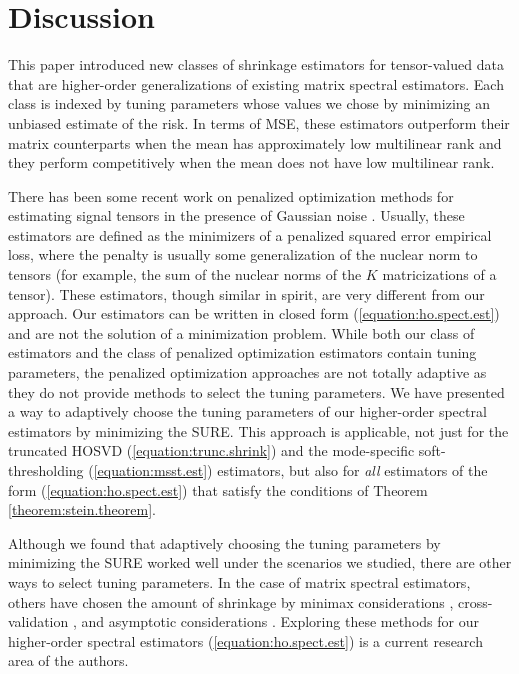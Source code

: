 \section{Discussion}
\label{sec:discussion}

This paper introduced new classes of shrinkage estimators for
tensor-valued data that are higher-order generalizations of existing
matrix spectral estimators. Each class is indexed by tuning parameters
whose values we chose by minimizing an unbiased estimate of the
risk. In terms of MSE, these estimators outperform their matrix
counterparts when the mean has approximately low multilinear rank and
they perform competitively when the mean does not have low multilinear
rank.

There has been some recent work on penalized optimization methods for
estimating signal tensors in the presence of Gaussian noise
\citep{signoretto2010convex,tomioka2011estimation,tomioka2011statistical,liu2013tensor,tomioka2013convex}. Usually,
these estimators are defined as the minimizers of a penalized squared
error empirical loss, where the penalty is usually some generalization
of the nuclear norm to tensors (for example, the sum of the nuclear
norms of the $K$ matricizations of a tensor). These estimators, though
similar in spirit, are very different from our approach. Our
estimators can be written in closed form (\ref{equation:ho.spect.est})
and are not the solution of a minimization problem. While both our
class of estimators and the class of penalized optimization estimators
contain tuning parameters, the penalized optimization approaches are
not totally adaptive as they do not provide methods to select the
tuning parameters. We have presented a way to adaptively choose the
tuning parameters of our higher-order spectral estimators by
minimizing the SURE. This approach is applicable, not just for the
truncated HOSVD (\ref{equation:trunc.shrink}) and the mode-specific
soft-thresholding (\ref{equation:msst.est}) estimators, but also for
\emph{all} estimators of the form (\ref{equation:ho.spect.est}) that
satisfy the conditions of Theorem \ref{theorem:stein.theorem}.

Although we found that adaptively choosing the tuning parameters by
minimizing the SURE worked well under the scenarios we studied, there
are other ways to select tuning parameters. In the case of matrix
spectral estimators, others have chosen the amount of shrinkage by
minimax considerations \citep{efron1972empirical,stein1981estimation},
cross-validation \citep{bro2008cross,owen2009bi,josse2012selecting},
and asymptotic considerations
\citep{gavish2014optimalhard,gavish2014optimal}. Exploring these
methods for our higher-order spectral estimators
(\ref{equation:ho.spect.est}) is a current research area of the
authors.


